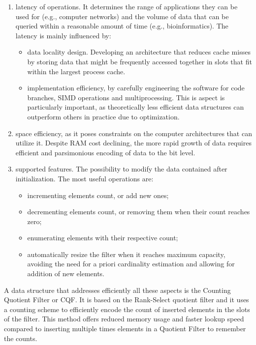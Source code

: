 \begin{enumerate}
	\item latency of \memb operations. It determines the range of applications they can be used for (e.g., computer networks) and the volume of data that can be queried within a reasonable amount of time (e.g., bioinformatics). The latency is mainly influenced by:
	\begin{itemize}
		\item data locality design. Developing an architecture that reduces cache misses by storing data that might be frequently accessed together in slots that fit within the largest process cache.
		\item implementation efficiency, by carefully engineering the software for code branches, SIMD operations and multiprocessing. This is aspect is particularly important, as theoretically less efficient data structures can outperform others in practice due to optimization.
	\end{itemize}
	\item space efficiency, as it poses constraints on the computer architectures that can utilize it. Despite RAM cost declining, the more rapid growth of data requires efficient and parsimonious encoding of data to the bit level.
	\item supported features. The possibility to modify the data contained after initialization. The most useful operations are:
	\begin{itemize}
		\item incrementing elements count, or add new ones; 
		\item decrementing elements count, or removing them when their count reaches zero;
		\item enumerating elements with their respective count;
		\item automatically resize the filter when it reaches maximum capacity, avoiding the need for a priori cardinality estimation and allowing for addition of new elements.
	\end{itemize}
\end{enumerate}
A data structure that addresses efficiently all these aspects is the Counting Quotient Filter or \gls{CQF}. It is based on the Rank-Select quotient filter and it uses a counting scheme to efficiently encode the count of inserted elements in the slots of the filter. This method offers reduced memory usage and faster lookup speed compared to inserting multiple times elements in a Quotient Filter to remember the counts.
